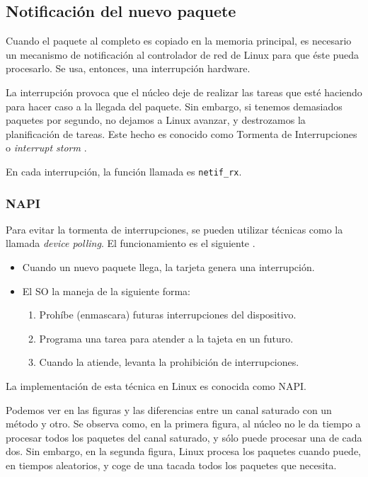 \subsection{Notificación del nuevo paquete}
Cuando el paquete al completo es copiado en la memoria principal, es necesario un mecanismo de notificación al 
\gls{controlador} de red de Linux para que éste pueda procesarlo. Se usa, entonces, 
una interrupción hardware.

La interrupción provoca que el núcleo deje de realizar las tareas que esté haciendo para hacer caso a la llegada del 
paquete. Sin embargo, si tenemos demasiados paquetes por segundo, no dejamos a Linux avanzar, y destrozamos la 
planificación de tareas. Este hecho es conocido como Tormenta de Interrupciones o 
\emph{interrupt storm} \cite{p206}.

En cada interrupción, la función llamada es \texttt{netif\_rx}.

\subsubsection{NAPI}
Para evitar la tormenta de interrupciones, se pueden utilizar técnicas como la llamada \emph{device polling}. El 
funcionamiento es el siguiente \cite{beyondDevicePolling}.
\begin{itemize}
 \item Cuando un nuevo paquete llega, la tarjeta genera una interrupción.
 \item El \gls{SO} la maneja de la siguiente forma:
 \begin{enumerate}
  \item Prohíbe (enmascara) futuras interrupciones del dispositivo.
  \item Programa una tarea para atender a la tajeta en un futuro.
  \item Cuando la atiende, levanta la prohibición de interrupciones.
 \end{enumerate}
\end{itemize}

La implementación de esta técnica en Linux es conocida como \gls{NAPI}.

Podemos ver en las figuras  y  las diferencias entre un canal saturado 
con un método y otro. Se observa como, en la primera figura, al núcleo no le da tiempo a procesar todos los paquetes 
del canal saturado, y sólo puede procesar una de cada dos. Sin embargo, en la segunda figura, Linux procesa los 
paquetes cuando puede, en tiempos aleatorios, y coge de una tacada todos los paquetes que necesita.

